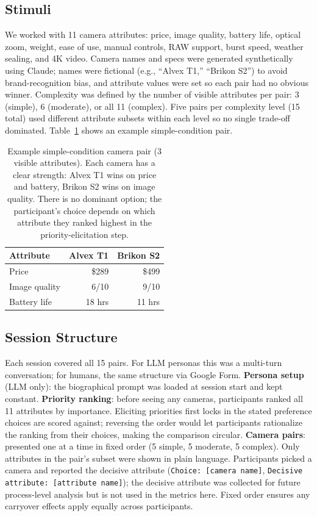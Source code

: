 \documentclass[manuscript,review]{acmart}
\begin{document}
\subsection{Stimuli}
We worked with 11 camera attributes: price, image quality, battery life, optical zoom, weight, ease of use, manual controls, RAW support, burst speed, weather sealing, and 4K video. Camera names and specs were generated synthetically using Claude; names were fictional (e.g., ``Alvex T1,'' ``Brikon S2'') to avoid brand-recognition bias, and attribute values were set so each pair had no obvious winner. Complexity was defined by the number of visible attributes per pair: 3 (simple), 6 (moderate), or all 11 (complex). Five pairs per complexity level (15 total) used different attribute subsets within each level so no single trade-off dominated. Table~\ref{tab:camera-pair} shows an example simple-condition pair.

\begin{table}[h]
  \caption{Example simple-condition camera pair (3 visible attributes). Each camera has a clear strength: Alvex T1 wins on price and battery, Brikon S2 wins on image quality. There is no dominant option; the participant's choice depends on which attribute they ranked highest in the priority-elicitation step.}
  \label{tab:camera-pair}
  \centering
  \begin{tabular}{l r r}
    \toprule
    \textbf{Attribute} & \textbf{Alvex T1} & \textbf{Brikon S2} \\
    \midrule
    Price          & \$289   & \$499   \\
    Image quality  & 6/10    & 9/10    \\
    Battery life   & 18 hrs  & 11 hrs  \\
    \bottomrule
  \end{tabular}
\end{table}

\subsection{Session Structure}
Each session covered all 15 pairs. For LLM personas this was a multi-turn conversation; for humans, the same structure via Google Form. \textbf{Persona setup} (LLM only): the biographical prompt was loaded at session start and kept constant. \textbf{Priority ranking}: before seeing any cameras, participants ranked all 11 attributes by importance. Eliciting priorities first locks in the stated preference choices are scored against; reversing the order would let participants rationalize the ranking from their choices, making the comparison circular. \textbf{Camera pairs}: presented one at a time in fixed order (5 simple, 5 moderate, 5 complex). Only attributes in the pair's subset were shown in plain language. Participants picked a camera and reported the decisive attribute (\texttt{Choice: [camera name]}, \texttt{Decisive attribute: [attribute name]}); the decisive attribute was collected for future process-level analysis but is not used in the metrics here. Fixed order ensures any carryover effects apply equally across participants.
\end{document}
